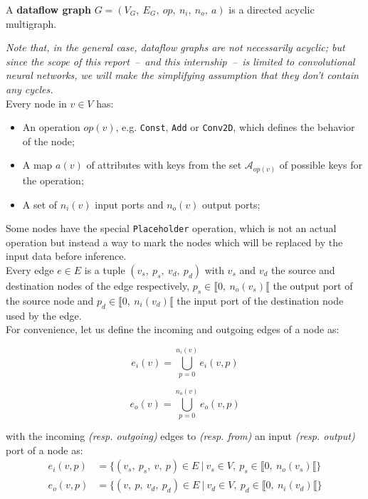 \documentclass[11pt]{article}
\begin{document}
\begin{definition}
A \textbf{dataflow graph} $G = (V_G,\ E_G,\ op,\ n_i,\ n_o,\ a)$ is a directed acyclic multigraph.

\textit{Note that, in the general case, dataflow graphs are not necessarily acyclic; but since the scope of this report~--~and this internship~--~is limited to convolutional neural networks, we will make the simplifying assumption that they don't contain any cycles.}\\

Every node in $v \in V$ has:
\begin{itemize}[noitemsep]
    \item An operation $op(v)$, e.g. \texttt{Const}, \texttt{Add} or \texttt{Conv2D}, which defines the behavior of the node;
    \item A map $a(v)$ of attributes with keys from the set $\mathcal{A}_{op(v)}$ of possible keys for the operation;
    \item A set of $n_i(v)$ input ports and $n_o(v)$ output ports;
\end{itemize}

Some nodes have the special \texttt{Placeholder} operation, which is not an actual operation but instead a way to mark the nodes which will be replaced by the input data before inference.\\

Every edge $e \in E$ is a tuple $(v_s,\ p_s,\ v_d,\ p_d)$ with $v_s$ and $v_d$ the source and destination nodes of the edge respectively, $p_s \in \llbracket 0,\ n_o(v_s) \llbracket$ the output port of the source node and $p_d \in \llbracket 0,\ n_i(v_d) \llbracket$ the input port of the destination node used by the edge.\\

For convenience, let us define the incoming and outgoing edges of a node as:

\noindent\begin{minipage}{.5\linewidth}
    \begin{equation*}
    e_i(v) = \bigcup_{p = 0}^{n_i(v)} e_i(v, p)
    \end{equation*}
\end{minipage}%
\begin{minipage}{.5\linewidth}
    \begin{equation*}
    e_o(v) = \bigcup_{p = 0}^{n_o(v)} e_o(v, p)
    \end{equation*}
\end{minipage}

\vspace{.5em}
\noindent
with the incoming \textit{(resp. outgoing)} edges to \textit{(resp. from)} an input \textit{(resp. output)} port of a node as:
\begin{align*}
    e_i(v, p) &= \{(v_s,\ p_s,\ v,\ p) \in E\ |\ v_s \in V,\ p_s \in \llbracket 0,\ n_o(v_s) \llbracket \}\\
    e_o(v, p) &= \{(v,\ p,\ v_d,\ p_d) \in E\ |\ v_d \in V,\ p_d \in \llbracket 0,\ n_i(v_d) \llbracket \}\\
\end{align*}
\end{definition}
\end{document}

